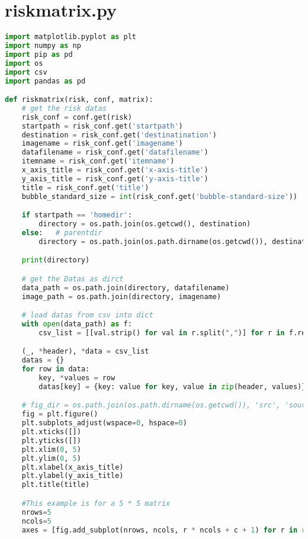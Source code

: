 
\section{riskmatrix.py}
\lstset{style=gra_codestyle}
\begin{lstlisting}[language=python, caption=Python LaTex - riskmatrix.py - Risxikomatrizen,captionpos=b,label={lst:riskmatrix},breaklines=true]
import matplotlib.pyplot as plt
import numpy as np
import pip as pd
import os
import csv
import pandas as pd

def riskmatrix(risk, conf, matrix):
    # get the risk datas
    risk_conf = conf.get(risk)
    startpath = risk_conf.get('startpath')
    destination = risk_conf.get('destinatination')
    imagename = risk_conf.get('imagename')
    datafilename = risk_conf.get('datafilename')
    itemname = risk_conf.get('itemname')
    x_axis_title = risk_conf.get('x-axis-title')
    y_axis_title = risk_conf.get('y-axis-title')
    title = risk_conf.get('title')
    bubble_standard_size = int(risk_conf.get('bubble-standard-size'))

    if startpath == 'homedir':
        directory = os.path.join(os.getcwd(), destination)
    else:   # parentdir
        directory = os.path.join(os.path.dirname(os.getcwd()), destination)

    print(directory)

    # get the Datas as dirct
    data_path = os.path.join(directory, datafilename)
    image_path = os.path.join(directory, imagename)

    # load datas from csv into dict
    with open(data_path) as f:
        csv_list = [[val.strip() for val in r.split(",")] for r in f.readlines()]

    (_, *header), *data = csv_list
    datas = {}
    for row in data:
        key, *values = row
        datas[key] = {key: value for key, value in zip(header, values)}

    # fig_dir = os.path.join(os.path.dirname(os.getcwd()), 'src', 'source')
    fig = plt.figure()
    plt.subplots_adjust(wspace=0, hspace=0)
    plt.xticks([])
    plt.yticks([])
    plt.xlim(0, 5)
    plt.ylim(0, 5)
    plt.xlabel(x_axis_title)
    plt.ylabel(y_axis_title)
    plt.title(title)

    #This example is for a 5 * 5 matrix
    nrows=5
    ncols=5
    axes = [fig.add_subplot(nrows, ncols, r * ncols + c + 1) for r in range(0, nrows) for c in range(0, ncols) ]


\end{lstlisting}
